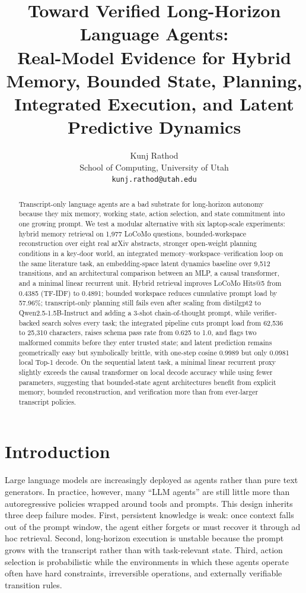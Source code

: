 \documentclass[11pt]{article}
\title{Toward Verified Long-Horizon Language Agents:\\Real-Model Evidence for Hybrid Memory, Bounded State, Planning, Integrated Execution, and Latent Predictive Dynamics}
\author{Kunj Rathod\\School of Computing, University of Utah\\\texttt{kunj.rathod@utah.edu}}
\date{}
\begin{document}
\maketitle

\begin{abstract}
Transcript-only language agents are a bad substrate for long-horizon autonomy because they mix memory, working state, action selection, and state commitment into one growing prompt. We test a modular alternative with six laptop-scale experiments: hybrid memory retrieval on 1,977 LoCoMo questions, bounded-workspace reconstruction over eight real arXiv abstracts, stronger open-weight planning conditions in a key-door world, an integrated memory--workspace--verification loop on the same literature task, an embedding-space latent dynamics baseline over 9,512 transitions, and an architectural comparison between an MLP, a causal transformer, and a minimal linear recurrent unit. Hybrid retrieval improves LoCoMo Hits@5 from 0.4385 (TF-IDF) to 0.4891; bounded workspace reduces cumulative prompt load by 57.96\%; transcript-only planning still fails even after scaling from distilgpt2 to Qwen2.5-1.5B-Instruct and adding a 3-shot chain-of-thought prompt, while verifier-backed search solves every task; the integrated pipeline cuts prompt load from 62,536 to 25,310 characters, raises schema pass rate from 0.625 to 1.0, and flags two malformed commits before they enter trusted state; and latent prediction remains geometrically easy but symbolically brittle, with one-step cosine 0.9989 but only 0.0981 local Top-1 decode. On the sequential latent task, a minimal linear recurrent proxy slightly exceeds the causal transformer on local decode accuracy while using fewer parameters, suggesting that bounded-state agent architectures benefit from explicit memory, bounded reconstruction, and verification more than from ever-larger transcript policies.
\end{abstract}

\section{Introduction}
Large language models are increasingly deployed as agents rather than pure text generators. In practice, however, many ``LLM agents'' are still little more than autoregressive policies wrapped around tools and prompts. This design inherits three deep failure modes. First, persistent knowledge is weak: once context falls out of the prompt window, the agent either forgets or must recover it through ad hoc retrieval. Second, long-horizon execution is unstable because the prompt grows with the transcript rather than with task-relevant state. Third, action selection is probabilistic while the environments in which these agents operate often have hard constraints, irreversible operations, and externally verifiable transition rules.
\end{document}
